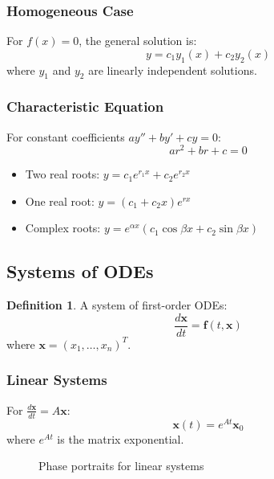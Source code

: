 \documentclass[11pt]{article}
\theoremstyle{definition}
\newtheorem{definition}{Definition}[section]
\begin{document}
\subsubsection{Homogeneous Case}
For $f(x) = 0$, the general solution is:
$$y = c_1 y_1(x) + c_2 y_2(x)$$
where $y_1$ and $y_2$ are linearly independent solutions.

\subsubsection{Characteristic Equation}
For constant coefficients $ay'' + by' + cy = 0$:
$$ar^2 + br + c = 0$$
\begin{itemize}
    \item Two real roots: $y = c_1 e^{r_1 x} + c_2 e^{r_2 x}$
    \item One real root: $y = (c_1 + c_2 x) e^{r x}$
    \item Complex roots: $y = e^{\alpha x}(c_1 \cos \beta x + c_2 \sin \beta x)$
\end{itemize}

\subsection{Systems of ODEs}
\begin{definition}
A system of first-order ODEs:
$$\frac{d\mathbf{x}}{dt} = \mathbf{f}(t, \mathbf{x})$$
where $\mathbf{x} = (x_1, \ldots, x_n)^T$.
\end{definition}

\subsubsection{Linear Systems}
For $\frac{d\mathbf{x}}{dt} = A\mathbf{x}$:
$$\mathbf{x}(t) = e^{At}\mathbf{x}_0$$
where $e^{At}$ is the matrix exponential.

\begin{figure}[h]
\centering
{}
\caption{Phase portraits for linear systems}
\end{figure}
\end{document}
